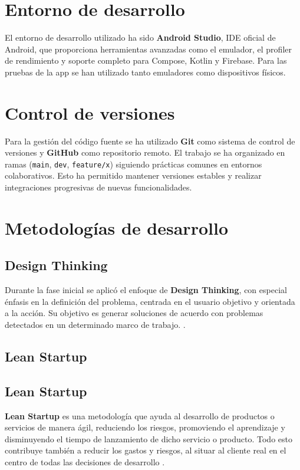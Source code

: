 \section{Entorno de desarrollo}

El entorno de desarrollo utilizado ha sido \textbf{Android Studio}, IDE oficial de Android, que proporciona herramientas avanzadas como el emulador, el profiler de rendimiento y soporte completo para Compose, Kotlin y Firebase. Para las pruebas de la app se han utilizado tanto emuladores como dispositivos físicos.

\section{Control de versiones}

Para la gestión del código fuente se ha utilizado \textbf{Git} como sistema de control de versiones y \textbf{GitHub} como repositorio remoto. El trabajo se ha organizado en ramas (\texttt{main}, \texttt{dev}, \texttt{feature/x}) siguiendo prácticas comunes en entornos colaborativos. Esto ha permitido mantener versiones estables y realizar integraciones progresivas de nuevas funcionalidades.

\section{Metodologías de desarrollo}

\subsection{Design Thinking}

Durante la fase inicial se aplicó el enfoque de \textbf{Design Thinking}, con especial énfasis en la definición del problema, centrada en el usuario objetivo y orientada a la acción. Su objetivo es generar soluciones de acuerdo con problemas detectados en un determinado marco de trabajo.   \cite{designthinking} \cite{designthinking-url}.

\subsection{Lean Startup}

\subsection{Lean Startup}

\textbf{Lean Startup} es una metodología que ayuda al desarrollo de productos o servicios de manera ágil, reduciendo los riesgos, promoviendo el aprendizaje y disminuyendo el tiempo de lanzamiento de dicho servicio o producto. Todo esto contribuye también a reducir los gastos y riesgos, al situar al cliente real en el centro de todas las decisiones de desarrollo \cite{leanstartup}.


